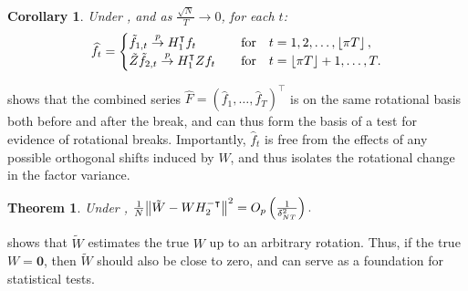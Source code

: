 \documentclass[12pt]{article}
\newtheorem{theorem}{Theorem}[section]
\newtheorem{corollary}{Corollary}[theorem]
\newcommand*{\tran}{\intercal}
\theoremstyle{plain}
\numberwithin{equation}{section}
\begin{document}
\begin{corollary}
\label{cor:Z_cor}
Under , and as $\frac{\sqrt{N}}{T} \to 0$, for each $t$:
\begin{align}
\widehat{f}_t = 
\begin{cases}
\tilde{f}_{1, t} \convp H_1^\tran f_t \quad &\text{for} \quad t = 1, 2, \dots, \floor{\pi T}, \\
\tilde{Z} \tilde{f}_{2, t} \convp H_1^\tran Z f_t \quad &\text{for} \quad t = \floor{\pi T} + 1, \dots, T.
\end{cases}
\end{align}
\end{corollary}
 shows that the combined series $\widehat{F} = (\widehat{f}_1, \dots, \widehat{f}_T)^\tran$ is on the same rotational basis both before and after the break, and can thus form the basis of a test for evidence of rotational breaks. Importantly, $\widehat{f}_t$ is free from the effects of any possible orthogonal shifts induced by $W$, and thus isolates the rotational change in the factor variance. 
\begin{theorem}
\label{thm:3:Wtilde_consistency}
Under ,
$\frac{1}{N} \norm{\tilde{W} - W H_{2}^{-\tran}}^2 = 
\Opdeltasq.
$
\end{theorem}
 shows that $\tilde{W}$ estimates the true $W$ up to an arbitrary rotation. Thus, if the true $W = \mathbf{0}$, then $\tilde{W}$ should also be close to zero, and can serve as a foundation for statistical tests.

\end{document}
